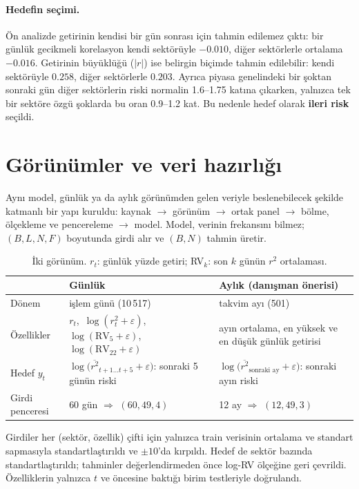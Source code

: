 \documentclass[11pt,a4paper]{article}
\begin{document}
\paragraph{Hedefin seçimi.} Ön analizde getirinin kendisi bir gün sonrası için tahmin edilemez çıktı:
bir günlük gecikmeli korelasyon kendi sektörüyle $-0.010$, diğer sektörlerle ortalama $-0.016$.
Getirinin büyüklüğü ($|r|$) ise belirgin biçimde tahmin edilebilir: kendi sektörüyle $0.258$, diğer sektörlerle $0.203$.
Ayrıca piyasa genelindeki bir şoktan sonraki gün diğer sektörlerin riski normalin 1.6--1.75 katına çıkarken,
yalnızca tek bir sektöre özgü şoklarda bu oran 0.9--1.2 kat. Bu nedenle hedef olarak \textbf{ileri risk} seçildi.

\section{Görünümler ve veri hazırlığı}
Aynı model, günlük ya da aylık görünümden gelen veriyle beslenebilecek şekilde katmanlı bir yapı kuruldu:
kaynak $\to$ görünüm $\to$ ortak panel $\to$ bölme, ölçekleme ve pencereleme $\to$ model.
Model, verinin frekansını bilmez; $(B, L, N, F)$ boyutunda girdi alır ve $(B, N)$ tahmin üretir.

\begin{table}[h]
\centering\small
\caption{İki görünüm. $r_t$: günlük yüzde getiri; RV$_k$: son $k$ günün $r^2$ ortalaması.}
\label{tab:views}
\begin{tabular}{@{}p{2.6cm}p{6.2cm}p{6.2cm}@{}}
\toprule
 & \textbf{Günlük} & \textbf{Aylık} (danışman önerisi) \\
\midrule
Dönem & işlem günü (10\,517) & takvim ayı (501) \\
Özellikler & $r_t$,\ $\log(r_t^2+\varepsilon)$,\ $\log(\text{RV}_5+\varepsilon)$,\ $\log(\text{RV}_{22}+\varepsilon)$ &
             ayın ortalama, en yüksek ve en düşük günlük getirisi \\
Hedef $y_t$ & $\log\big(\overline{r^2}_{t+1\ldots t+5}+\varepsilon\big)$: sonraki 5 günün riski &
              $\log\big(\overline{r^2}_{\text{sonraki ay}}+\varepsilon\big)$: sonraki ayın riski \\
Girdi penceresi & 60 gün $\Rightarrow$ $(60, 49, 4)$ & 12 ay $\Rightarrow$ $(12, 49, 3)$ \\
\bottomrule
\end{tabular}
\end{table}

\noindent
Girdiler her (sektör, özellik) çifti için yalnızca train verisinin ortalama ve standart sapmasıyla standartlaştırıldı
ve $\pm10$'da kırpıldı. Hedef de sektör bazında standartlaştırıldı; tahminler değerlendirmeden önce log-RV
ölçeğine geri çevrildi. Özelliklerin yalnızca $t$ ve öncesine baktığı birim testleriyle doğrulandı.
\end{document}
